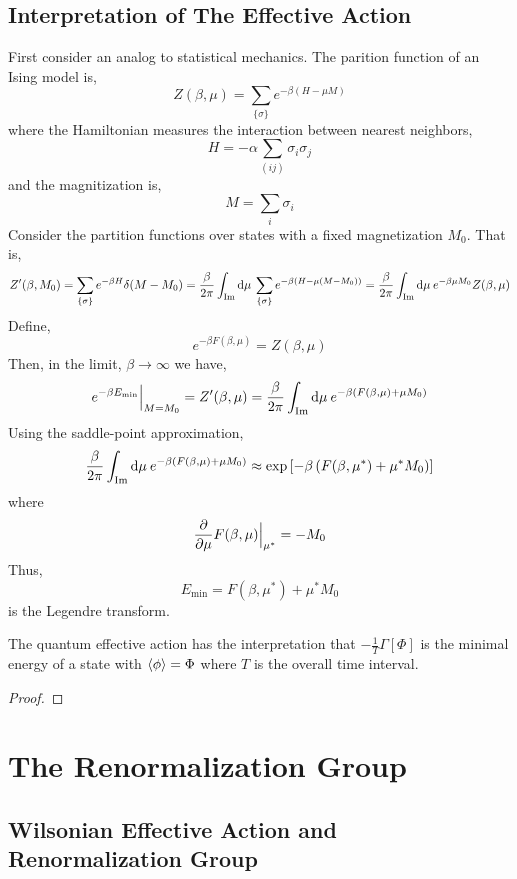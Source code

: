 \documentclass[12pt]{extarticle}
\begin{document}
\subsection{Interpretation of The Effective Action}

First consider an analog to statistical mechanics. The parition function of an Ising model is,
\[ Z(\beta, \mu) = \sum_{\{ \sigma \}} e^{- \beta(H - \mu M) } \]
where the Hamiltonian measures the interaction between nearest neighbors,
\[ H = - \alpha \sum_{(ij)} \sigma_i \sigma_j \]
and the magnitization is,
\[ M = \sum_i \sigma_i \]
Consider the partition functions over states with a fixed magnetization $M_0$. That is,
\[ Z'(\beta, M_0) = \sum_{ \{ \sigma \} } e^{- \beta H} \delta(M - M_0) = \frac{\beta}{2 \pi} \int_{\text{Im}} \mathrm{d}\mu \: \sum_{ \{ \sigma \} } e^{- \beta (H - \mu (M -  M_0))} = \frac{\beta}{2 \pi} \int_{\text{Im}} \mathrm{d}\mu \: e^{- \beta \mu M_0} Z(\beta, \mu) \] 
Define,
\[ e^{- \beta F(\beta, \mu)} = Z(\beta, \mu) \]
Then, in the limit, $\beta \to \infty$ we have,
\[ e^{- \beta E_{\text{min}}} \Big|_{M = M_0} = Z'(\beta, \mu) = \frac{\beta}{2\pi} \int_{\text{Im}} \mathrm{d}\mu \: e^{- \beta \left( F(\beta, \mu) + \mu M_0 \right) } \]
Using the saddle-point approximation,
\[ \frac{\beta}{2\pi} \int_{\text{Im}} \mathrm{d}\mu \: e^{- \beta \left( F(\beta, \mu) + \mu M_0 \right) } \approx \exp{\left[ - \beta \left( F(\beta, \mu^*) + \mu^* M_0 \right) \right] } \]
where
\[ \frac{\partial{}}{\partial{\mu}} F(\beta,\mu) \Big|_{\mu^*} = -M_0 \] 
Thus,
\[ E_{\text{min}} = F(\beta, \mu^*) + \mu^* M_0 \]
is the Legendre transform. 

\begin{theorem}
The quantum effective action has the interpretation that $- \frac{1}{T} \Gamma[\Phi]$ is the minimal energy of a state with $\left< \phi \right> = \Phi$ where $T$ is the overall time interval. 
\end{theorem}

\begin{proof}

\end{proof}

\section{The Renormalization Group}

\subsection{Wilsonian Effective Action and Renormalization Group}
\end{document}
